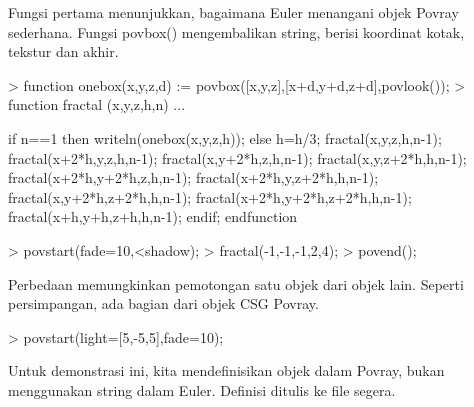 \documentclass[a4paper,10pt]{article}
\begin{document}
\begin{eulernotebook}
\begin{eulercomment}
\begin{eulercomment}
\begin{eulercomment}
Fungsi pertama menunjukkan, bagaimana Euler menangani objek Povray
sederhana. Fungsi povbox() mengembalikan string, berisi koordinat
kotak, tekstur dan akhir.
\end{eulercomment}
\begin{eulerprompt}
> function onebox(x,y,z,d) := povbox([x,y,z],[x+d,y+d,z+d],povlook());
> function fractal (x,y,z,h,n) ...
\end{eulerprompt}
\begin{eulerudf}
   if n==1 then writeln(onebox(x,y,z,h));
   else
     h=h/3;
     fractal(x,y,z,h,n-1);
     fractal(x+2*h,y,z,h,n-1);
     fractal(x,y+2*h,z,h,n-1);
     fractal(x,y,z+2*h,h,n-1);
     fractal(x+2*h,y+2*h,z,h,n-1);
     fractal(x+2*h,y,z+2*h,h,n-1);
     fractal(x,y+2*h,z+2*h,h,n-1);
     fractal(x+2*h,y+2*h,z+2*h,h,n-1);
     fractal(x+h,y+h,z+h,h,n-1);
   endif;
  endfunction
\end{eulerudf}
\begin{eulerprompt}
> povstart(fade=10,<shadow);
> fractal(-1,-1,-1,2,4);
> povend();
\end{eulerprompt}
\begin{eulercomment}
Perbedaan memungkinkan pemotongan satu objek dari objek lain. Seperti
persimpangan, ada bagian dari objek CSG Povray.
\end{eulercomment}
\begin{eulerprompt}
> povstart(light=[5,-5,5],fade=10);
\end{eulerprompt}
\begin{eulercomment}
Untuk demonstrasi ini, kita mendefinisikan objek dalam Povray, bukan
menggunakan string dalam Euler. Definisi ditulis ke file segera.


\end{eulercomment}
\end{eulercomment}
\end{eulercomment}
\end{eulernotebook}
\end{document}
